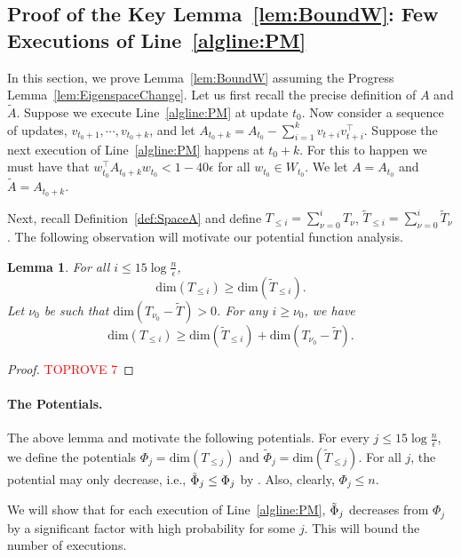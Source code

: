 \documentclass[11pt]{article}
\newtheorem{lemma}[theorem]{Lemma}
\def\dim#1{\mathrm{dim} (#1)}
\newcommand\vv{\boldsymbol{\mathit{v}}}
\newcommand\ww{\boldsymbol{\mathit{w}}}
\renewcommand\AA{\boldsymbol{\mathit{A}}}
\newcommand\WW{\boldsymbol{\mathit{W}}}
\newcommand\Ttil{{\tilde{\mathit{T}}}}
\newcommand\AAtil{\boldsymbol{\widetilde{\mathit{A}}}}
\begin{document}
\subsection{Proof of the Key Lemma~\ref{lem:BoundW}: Few Executions of Line~\ref{algline:PM}}

\label{sec:proof key}

In this section, we prove Lemma~\ref{lem:BoundW} assuming the Progress Lemma~\ref{lem:EigenspaceChange}. 
Let us first recall the precise definition of $\AA$ and $\AAtil$. Suppose we execute Line~\ref{algline:PM} at update $t_{0}$. Now consider a sequence of updates, $\vv_{t_{0}+1},\cdots,\vv_{t_{0}+k}$, and let $\AA_{t_{0}+k}=\AA_{t_{0}}-\sum_{i=1}^{k}\vv_{t+i}\vv_{t+i}^{\top}.$ Suppose the next execution of Line~\ref{algline:PM} happens at $t_{0}+k$. For this to happen we must have that $\ww_{t_{0}}^{\top}\AA_{t_{0}+k}\ww_{t_{0}}<1-40\epsilon$ for all $\ww_{t_{0}}\in\WW_{t_{0}}$. We let $\AA=\AA_{t_{0}}$ and $\AAtil=\AA_{t_{0}+k}$. 

Next, recall Definition~\ref{def:SpaceA} and define $T_{\leq i}=\sum_{\nu=0}^{i}T_{\nu}$, $\tilde{T}_{\leq i}=\sum_{\nu=0}^{i}\tilde{T}_{\nu}$. The following observation will motivate our potential function analysis.
\begin{lemma}
	\label{lem:Monotone} For all $i\leq15\log\frac{n}{\epsilon}$, 
	\[
	\dim{T_{\le i}}\ge\dim{\Ttil_{\le i}}.
	\]
	Let $\nu_{0}$ be such that $\dim{T_{\nu_{0}}-\tilde{T}}>0$. For any $i\ge\nu_{0}$, we have
	\[
	\dim{T_{\le i}}\geq\dim{\Ttil_{\le i}}+\dim{T_{\nu_{0}}-\Ttil}.
	\]
	
\end{lemma}

\begin{proof}\textcolor{red}{TOPROVE 7}\end{proof}

\paragraph{The Potentials.}
The above lemma and  motivate the following potentials.
For every $j\le15\log\frac{n}{\epsilon}$, we define the potentials $\Phi_{j}=\dim{T_{\le j}}$ and $\tilde{\Phi}_{j}=\dim{\Ttil_{\le j}}$. For all $j$, the potential may only decrease, i.e., $\tilde{\Phi}_{j}\le\Phi_{j}$ by . Also, clearly, $\Phi_{j}\le n$. 

We will show that for each execution of Line~\ref{algline:PM}, $\tilde{\Phi}_{j}$ decreases from $\Phi_j$ by a significant factor with high probability for some $j$. This will bound the number of executions.
\end{document}
